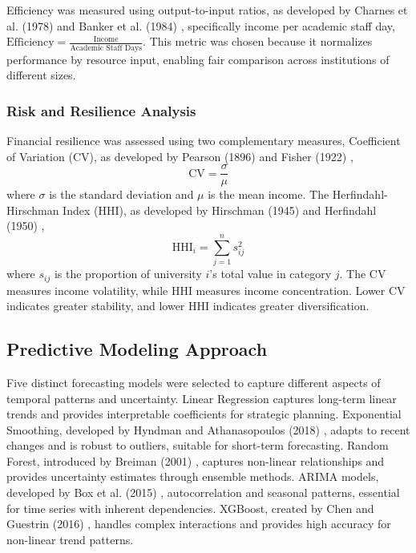 \documentclass[journal,onecolumn, 10pt,draftclsnofoot]{IEEEtran}
\begin{document}
Efficiency was measured using output-to-input ratios, as developed by Charnes et al. (1978) \cite{charnes1978measuring} and Banker et al. (1984) \cite{banker1984models}, specifically income per academic staff day, $\text{Efficiency} = \frac{\text{Income}}{\text{Academic Staff Days}}$. This metric was chosen because it normalizes performance by resource input, enabling fair comparison across institutions of different sizes.

\subsubsection{Risk and Resilience Analysis}

Financial resilience was assessed using two complementary measures, Coefficient of Variation (CV), as developed by Pearson (1896) \cite{pearson1896contributions} and Fisher (1922) \cite{fisher1922mathematical},
\begin{equation}
\mathrm{CV} = \frac{\sigma}{\mu}
\end{equation}
where $\sigma$ is the standard deviation and $\mu$ is the mean income. The Herfindahl-Hirschman Index (HHI), as developed by Hirschman (1945) \cite{hirschman1945national} and Herfindahl (1950) \cite{herfindahl1950concentration},
\begin{equation}
\mathrm{HHI}_i = \sum_{j=1}^n s_{ij}^2
\end{equation}
where $s_{ij}$ is the proportion of university $i$'s total value in category $j$. The CV measures income volatility, while HHI measures income concentration. Lower CV indicates greater stability, and lower HHI indicates greater diversification.

\subsection{Predictive Modeling Approach}

Five distinct forecasting models were selected to capture different aspects of temporal patterns and uncertainty. Linear Regression captures long-term linear trends and provides interpretable coefficients for strategic planning. Exponential Smoothing, developed by Hyndman and Athanasopoulos (2018) \cite{hyndman2018forecasting}, adapts to recent changes and is robust to outliers, suitable for short-term forecasting. Random Forest, introduced by Breiman (2001) \cite{breiman2001random}, captures non-linear relationships and provides uncertainty estimates through ensemble methods. ARIMA models, developed by Box et al. (2015) \cite{box2015time}, autocorrelation and seasonal patterns, essential for time series with inherent dependencies. XGBoost, created by Chen and Guestrin (2016) \cite{chen2016xgboost}, handles complex interactions and provides high accuracy for non-linear trend patterns.
\end{document}
